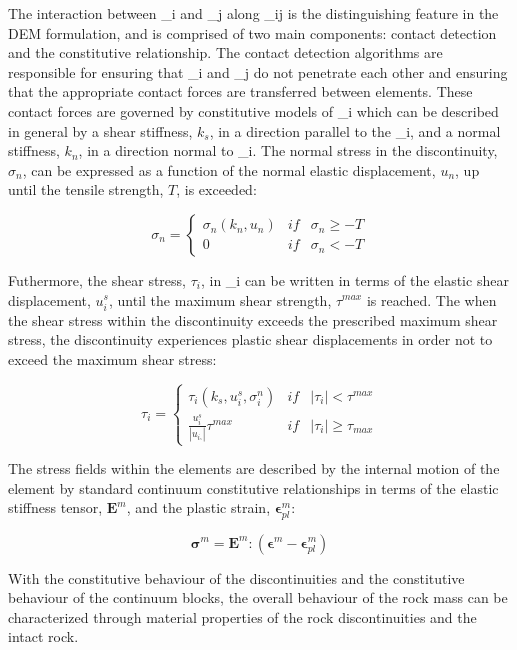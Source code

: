 
The interaction between \Omega_i and \Omega_j along \Gamma_ij is the distinguishing feature in the DEM formulation, and is comprised of two main components: contact detection and the constitutive relationship. The contact detection algorithms are responsible for ensuring that \Omega_i and \Omega_j do not penetrate each other and ensuring that the appropriate contact forces are transferred between elements. These contact forces are governed by constitutive models of \Gamma_i which can be described in general by a shear stiffness, $k_s$, in a direction parallel to the \Gamma_i, and a normal stiffness, $k_n$, in a direction normal to \Gamma_i. The normal stress in the discontinuity, $\sigma_n$, can be expressed as a function of the normal elastic displacement, $u_n$, up until the tensile strength, $T$, is exceeded: 

\begin{equation}
\sigma_n=\left\{\begin{matrix}
\sigma_n\left(k_n, u_n\right) &if&\sigma_n \geq -T\\ 
 0 & if &\sigma_n < -T
\end{matrix}\right.
\label{eqn:demnormal}
\end{equation}

Futhermore, the shear stress, $\tau_i$, in \Gamma_i can be written in terms of the elastic shear displacement, $u_i^s$, until the maximum shear strength, $\tau^{max}$ is reached. The when the shear stress within the discontinuity exceeds the prescribed maximum shear stress, the discontinuity experiences plastic shear displacements in order not to exceed the maximum shear stress:

\begin{equation}
\tau_i=\left\{\begin{matrix}
\tau_i\left(k_s,u_i^s, \sigma_i^n\right) &if&\left |\tau_i \right | < \tau^{max}\\ 
\frac{u_i^s}{\left|u_i_^s\right|}\tau^{max} & if &\left |\tau_i \right | \geq \tau_{max}
\end{matrix}\right.
\label{eqn:demshear}
\end{equation}

The stress fields within the elements are described by the internal motion of the element by standard continuum constitutive relationships in terms of the elastic stiffness tensor, $\mathbf{E}^m$, and the plastic strain, $\boldsymbol{\epsilon}^m_{pl}$:  

\begin{equation}
\boldsymbol{\sigma}^m =\mathbf{E}^m:\left(\boldsymbol{\epsilon}^m - \boldsymbol{\epsilon}^m_{pl}\right)
\label{eqn:demcont}
\end{equation}

With the constitutive behaviour of the discontinuities and the constitutive behaviour of the continuum blocks, the overall behaviour of the rock mass can be characterized through material properties of the rock discontinuities and the intact rock.